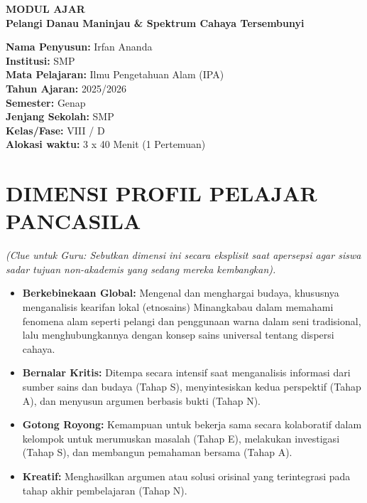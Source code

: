 \documentclass[12pt,a4paper]{article}
\begin{document}
\begin{center}
{\Huge\textbf{MODUL AJAR}}\\
\vspace{0.5cm}
{\Large\textbf{Pelangi Danau Maninjau \& Spektrum Cahaya Tersembunyi}}
\end{center}

\vspace{1cm}

\begin{tcolorbox}[colback=white,colframe=black,boxrule=1pt]
\textbf{Nama Penyusun:} Irfan Ananda\\
\textbf{Institusi:} SMP\\
\textbf{Mata Pelajaran:} Ilmu Pengetahuan Alam (IPA)\\
\textbf{Tahun Ajaran:} 2025/2026\\
\textbf{Semester:} Genap\\
\textbf{Jenjang Sekolah:} SMP\\
\textbf{Kelas/Fase:} VIII / D\\
\textbf{Alokasi waktu:} 3 x 40 Menit (1 Pertemuan)
\end{tcolorbox}

\section{DIMENSI PROFIL PELAJAR PANCASILA}
\textit{(Clue untuk Guru: Sebutkan dimensi ini secara eksplisit saat apersepsi agar siswa sadar tujuan non-akademis yang sedang mereka kembangkan).}

\begin{itemize}
\item \textbf{Berkebinekaan Global:} Mengenal dan menghargai budaya, khususnya menganalisis kearifan lokal (etnosains) Minangkabau dalam memahami fenomena alam seperti pelangi dan penggunaan warna dalam seni tradisional, lalu menghubungkannya dengan konsep sains universal tentang dispersi cahaya.
\item \textbf{Bernalar Kritis:} Ditempa secara intensif saat menganalisis informasi dari sumber sains dan budaya (Tahap S), menyintesiskan kedua perspektif (Tahap A), dan menyusun argumen berbasis bukti (Tahap N).
\item \textbf{Gotong Royong:} Kemampuan untuk bekerja sama secara kolaboratif dalam kelompok untuk merumuskan masalah (Tahap E), melakukan investigasi (Tahap S), dan membangun pemahaman bersama (Tahap A).
\item \textbf{Kreatif:} Menghasilkan argumen atau solusi orisinal yang terintegrasi pada tahap akhir pembelajaran (Tahap N).
\end{itemize}
\end{document}
